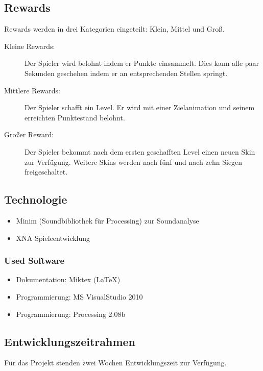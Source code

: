 \documentclass[Skript.tex]{subfiles}
\begin{document}
\subsection{Rewards}

Rewards werden in drei Kategorien eingeteilt: Klein, Mittel und Groß.

\begin{description}
\item[Kleine Rewards: ]	%
Der Spieler wird belohnt indem er Punkte einsammelt. 
Dies kann alle paar Sekunden geschehen indem er an entsprechenden Stellen springt.

\item[Mittlere Rewards: ] Der Spieler schafft ein Level.
Er wird mit einer Zielanimation und seinem erreichten Punktestand belohnt.

\item[Großer Reward: ] Der Spieler bekommt nach dem ersten geschafften Level einen neuen Skin zur Verfügung.
Weitere Skins werden nach fünf und nach zehn Siegen freigeschaltet.
\end{description}


\subsection{Technologie}

\begin{itemize}
\item Minim (Soundbibliothek für Processing) zur Soundanalyse
\item XNA Spieleentwicklung
\end{itemize}

\subsubsection{Used Software}

\begin{itemize}
\item Dokumentation:  Miktex (\LaTeX)
\item Programmierung:  MS VisualStudio 2010
\item Programmierung:  Processing 2.08b
\end{itemize}


\subsection{Entwicklungszeitrahmen}
Für das Projekt stenden zwei Wochen Entwicklungszeit zur Verfügung.
\end{document}
